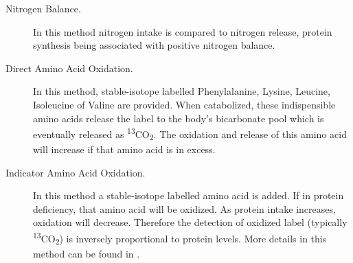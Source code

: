 \documentclass{tufte-handout}
\begin{document}
\begin{description}
\item [Nitrogen Balance.]  In this method nitrogen intake is compared to nitrogen release, protein synthesis being associated with positive nitrogen balance.
\item [Direct Amino Acid Oxidation.]  In this method, stable-isotope labelled Phenylalanine, Lysine, Leucine, Isoleucine of Valine are provided.   When catabolized, these indispensible amino acids release the label to the body's bicarbonate pool which is eventually released as \textsuperscript{13}CO\textsubscript{2}.  The oxidation and release of this amino acid will increase if that amino acid is in excess.
\item [Indicator Amino Acid Oxidation.] In this method a stable-isotope labelled amino acid is added.  If in protein deficiency, that amino acid will be oxidized.  As protein intake increases, oxidation will decrease.  Therefore the detection of oxidized label (typically \textsuperscript{13}CO\textsubscript{2}) is inversely proportional to protein levels.  More details in this method can be found in \citet{Elango2008}.
\end{description}


\end{document}
